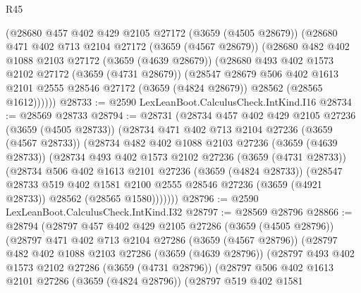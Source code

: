 \begin{lexlean}{R45}
\begin{coremodule}
    (@28680
      @457
      @402
      @429
      @2105
      @27172
      (@3659 (@4505 @28679))
      (@28680
        @471
        @402
        @713
        @2104
        @27172
        (@3659 (@4567 @28679))
        (@28680
          @482
          @402
          @1088
          @2103
          @27172
          (@3659 (@4639 @28679))
          (@28680
            @493
            @402
            @1573
            @2102
            @27172
            (@3659 (@4731 @28679))
            (@28547
              @28679
              @506
              @402
              @1613
              @2101
              @2555
              @28546
              @27172
              (@3659 (@4824 @28679))
              @28562
              (@28565 @1612))))))
@28733 := @2590 LexLeanBoot.CalculusCheck.IntKind.I16
@28734 := @28569 @28733
@28794 := @28731
    (@28734
      @457
      @402
      @429
      @2105
      @27236
      (@3659 (@4505 @28733))
      (@28734
        @471
        @402
        @713
        @2104
        @27236
        (@3659 (@4567 @28733))
        (@28734
          @482
          @402
          @1088
          @2103
          @27236
          (@3659 (@4639 @28733))
          (@28734
            @493
            @402
            @1573
            @2102
            @27236
            (@3659 (@4731 @28733))
            (@28734
              @506
              @402
              @1613
              @2101
              @27236
              (@3659 (@4824 @28733))
              (@28547
                @28733
                @519
                @402
                @1581
                @2100
                @2555
                @28546
                @27236
                (@3659 (@4921 @28733))
                @28562
                (@28565 @1580)))))))
@28796 := @2590 LexLeanBoot.CalculusCheck.IntKind.I32
@28797 := @28569 @28796
@28866 := @28794
    (@28797
      @457
      @402
      @429
      @2105
      @27286
      (@3659 (@4505 @28796))
      (@28797
        @471
        @402
        @713
        @2104
        @27286
        (@3659 (@4567 @28796))
        (@28797
          @482
          @402
          @1088
          @2103
          @27286
          (@3659 (@4639 @28796))
          (@28797
            @493
            @402
            @1573
            @2102
            @27286
            (@3659 (@4731 @28796))
            (@28797
              @506
              @402
              @1613
              @2101
              @27286
              (@3659 (@4824 @28796))
              (@28797
                @519
                @402
                @1581

\end{coremodule}
\end{lexlean}
